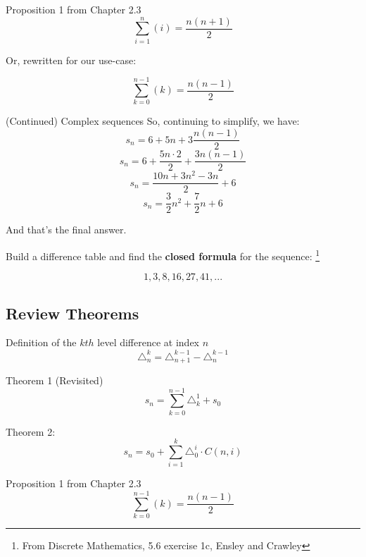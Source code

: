     \newpage

    \begin{intro}{Proposition 1 from Chapter 2.3}
        $$ \sum_{i=1}^{n} (i) = \frac{n(n+1)}{2} $$

        Or, rewritten for our use-case:

        $$ \sum_{k=0}^{n-1} (k) = \frac{n(n-1)}{2} $$        
    \end{intro}
    
    \begin{intro}{(Continued) Complex sequences}
        So, continuing to simplify, we have:
        $$ s_{n} = 6 + 5n + 3 \frac{n(n-1)}{2} $$
        $$ s_{n} = 6 + \frac{5n \cdot 2}{2} + \frac{3n(n-1)}{2} $$
        $$ s_{n} = \frac{10n + 3n^{2} - 3n}{2} + 6 $$
        $$ s_{n} = \frac{3}{2} n^{2} + \frac{7}{2} n + 6 $$

        And that's the final answer.
    \end{intro}
    
    \begin{questionNOGRADE}{\thequestion}
        Build a difference table and find the \textbf{closed formula} for the sequence:
        \footnote{From Discrete Mathematics, 5.6 exercise 1c, Ensley and Crawley}

        $$ 1, 3, 8, 16, 27, 41, ... $$
        
    \end{questionNOGRADE}


    \newpage

    \subsection{Review Theorems}

    \begin{intro}{Definition of the $kth$ level difference at index $n$}
        $$\triangle_{n}^{k} = \triangle_{n+1}^{k-1} - \triangle_{n}^{k-1}$$

    \end{intro}
    
    \begin{intro}{Theorem 1 (Revisited)}
        $$s_{n} = \sum_{k=0}^{n-1}{ \triangle_{k}^{1} } + s_{0} $$
    \end{intro}

    \begin{intro}{Theorem 2:}
        $$s_{n} = s_{0} + \sum_{i=1}^{k}{ \triangle_{0}^{i} \cdot C(n,i) }$$
    \end{intro}

    
    \begin{intro}{Proposition 1 from Chapter 2.3}
        $$ \sum_{k=0}^{n-1} (k) = \frac{n(n-1)}{2} $$        
    \end{intro}


